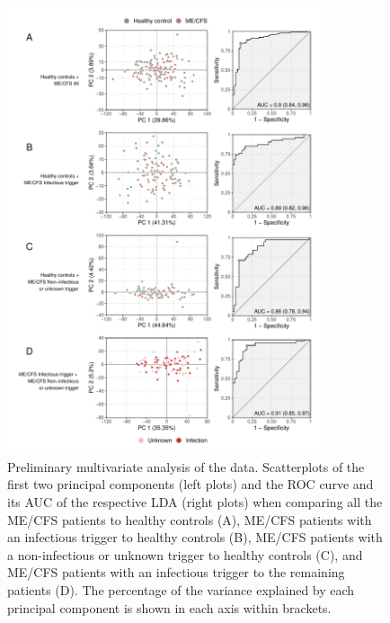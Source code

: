 \begin{figure}
    \centering
    \includegraphics[width=0.82\textwidth]{chapter/2022-revisiting-igg/figures/fig1-perliminary-multivariate-analysis}
    \caption[Preliminary multivariate analysis of the data]{Preliminary multivariate analysis of the data. Scatterplots of the first two principal components (left plots) and the ROC curve and its AUC of the respective LDA (right plots) when comparing all the ME/CFS patients to healthy controls (A), ME/CFS patients with an infectious trigger to healthy controls (B), ME/CFS patients with a non-infectious or unknown trigger to healthy controls (C), and ME/CFS patients with an infectious trigger to the remaining patients (D). The percentage of the variance explained by each principal component is shown in each axis within brackets.}
    \label{fig:fig1-perliminary-multivariate-analysis}
\end{figure}


